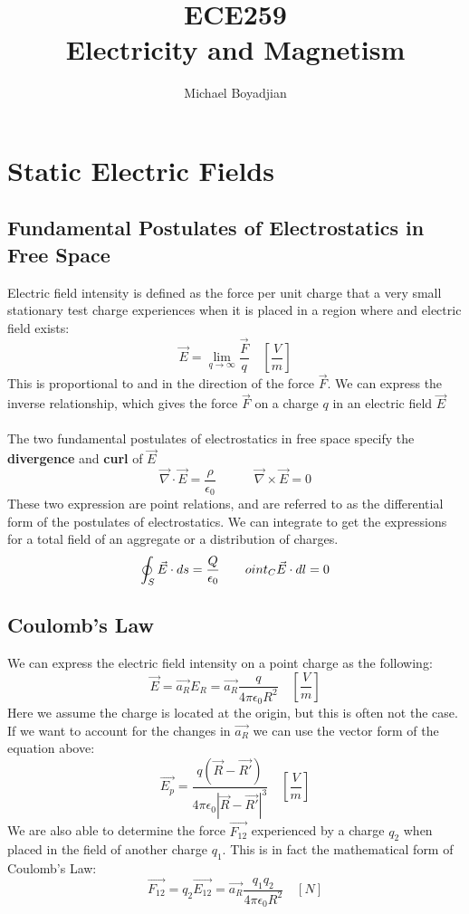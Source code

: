 \documentclass[11pt]{article}
\begin{document}
\title{ECE259 \\ Electricity and Magnetism}
\author{Michael Boyadjian}
\maketitle
\pagebreak

\tableofcontents

\pagebreak

\bigskip
\bigskip
\bigskip

\section{Static Electric Fields}

\subsection{Fundamental Postulates of Electrostatics in Free Space}
Electric field intensity is defined as the force per unit charge that a very small stationary test charge experiences when it is placed in a region where and electric field exists:
$$ \vec{E} = \lim_{q \to \infty} \frac{\vec{F}}{q} \quad \left[\frac{V}{m}\right] $$
This is proportional to and in the direction of the force $\vec{F}$. We can express the inverse relationship, which gives the force $\vec{F}$ on a charge $q$ in an electric field $\vec{E}$ \\ \\
The two fundamental postulates of electrostatics in free space specify the \textbf{divergence} and \textbf{curl} of $\vec{E}$
$$ \vec{ \nabla}  \cdot \vec{E} = \frac{\rho}{\epsilon_0} \quad \quad \quad \vec{ \nabla}  \times \vec{E} =0 $$
These two expression are point relations, and are referred to as the differential form of the postulates of electrostatics. We can integrate to get the expressions for a total field of an aggregate or a distribution of charges.
$$ \oint_{S} \vec{ E}  \cdot ds = \frac{Q}{\epsilon_0}\quad \quad \quad \\oint_{C} \vec{ E}  \cdot dl = 0 $$


\subsection{Coulomb's Law}
We can express the electric field intensity on a point charge as the following:
$$ \vec{E} = \vec{a_R}E_R = \vec{a_R} \frac{q}{4 \pi \epsilon_0 R^2} \quad \left[\frac{V}{m}\right]$$
Here we assume the charge is located at the origin, but this is often not the case. If we want to account for the changes in $\vec{a_R}$ we can use the vector form of the equation above:
$$ \vec{E_p} =  \frac{q (\vec{R} - \vec{R'})}{4 \pi \epsilon_0 |\vec{R} - \vec{R'}|^3} \quad \left[\frac{V}{m}\right]$$
We are also able to determine the force $\vec{F_{12}}$ experienced by a charge $q_2$ when placed in the field of another charge $q_1$. This is in fact the mathematical form of Coulomb's Law:
$$ \vec{F_{12}} = q_2\vec{E_{12}} = \vec{a_R} \frac{q_1q_2}{4\pi\epsilon_0R^2} \quad [N]$$
\end{document}
